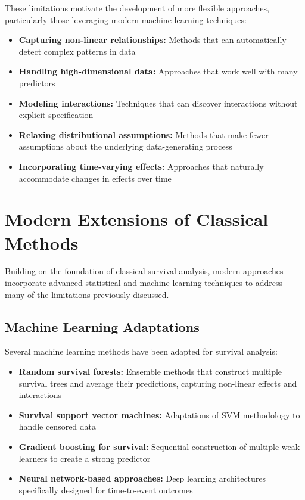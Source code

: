 These limitations motivate the development of more flexible approaches, particularly those leveraging modern machine learning techniques:
\begin{itemize}
    \item \textbf{Capturing non-linear relationships:} Methods that can automatically detect complex patterns in data
    \item \textbf{Handling high-dimensional data:} Approaches that work well with many predictors
    \item \textbf{Modeling interactions:} Techniques that can discover interactions without explicit specification
    \item \textbf{Relaxing distributional assumptions:} Methods that make fewer assumptions about the underlying data-generating process
    \item \textbf{Incorporating time-varying effects:} Approaches that naturally accommodate changes in effects over time
\end{itemize}

\section{Modern Extensions of Classical Methods}

Building on the foundation of classical survival analysis, modern approaches incorporate advanced statistical and machine learning techniques to address many of the limitations previously discussed.

\subsection{Machine Learning Adaptations}

Several machine learning methods have been adapted for survival analysis:
\begin{itemize}
    \item \textbf{Random survival forests:} Ensemble methods that construct multiple survival trees and average their predictions, capturing non-linear effects and interactions
    \item \textbf{Survival support vector machines:} Adaptations of SVM methodology to handle censored data
    \item \textbf{Gradient boosting for survival:} Sequential construction of multiple weak learners to create a strong predictor
    \item \textbf{Neural network-based approaches:} Deep learning architectures specifically designed for time-to-event outcomes
\end{itemize}

